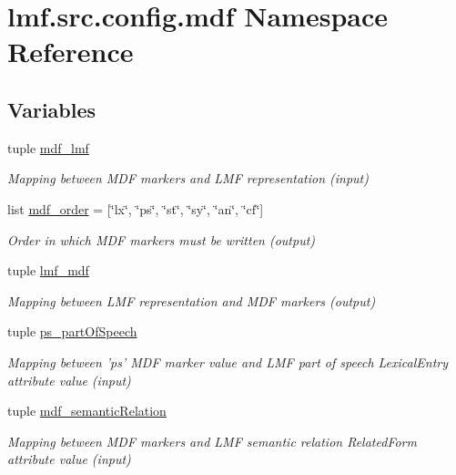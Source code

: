 \hypertarget{namespacelmf_1_1src_1_1config_1_1mdf}{\section{lmf.\+src.\+config.\+mdf Namespace Reference}
\label{namespacelmf_1_1src_1_1config_1_1mdf}
}
\subsection*{Variables}
\begin{DoxyCompactItemize}
\item 
tuple \hyperlink{namespacelmf_1_1src_1_1config_1_1mdf_a888cd9df8b9511d408e646dc404b5232}{mdf\+\_\+lmf}
\begin{DoxyCompactList}\small\item\em Mapping between M\+D\+F markers and L\+M\+F representation (input) \end{DoxyCompactList}\item 
list \hyperlink{namespacelmf_1_1src_1_1config_1_1mdf_afe5efb72442beb65b5083335b744845c}{mdf\+\_\+order} = \mbox{[}\char`\"{}lx\char`\"{}, \char`\"{}ps\char`\"{}, \char`\"{}st\char`\"{}, \char`\"{}sy\char`\"{}, \char`\"{}an\char`\"{}, \char`\"{}cf\char`\"{}\mbox{]}
\begin{DoxyCompactList}\small\item\em Order in which M\+D\+F markers must be written (output) \end{DoxyCompactList}\item 
tuple \hyperlink{namespacelmf_1_1src_1_1config_1_1mdf_a78d8f1444783c1b86cbbd91f49a0cd4f}{lmf\+\_\+mdf}
\begin{DoxyCompactList}\small\item\em Mapping between L\+M\+F representation and M\+D\+F markers (output) \end{DoxyCompactList}\item 
tuple \hyperlink{namespacelmf_1_1src_1_1config_1_1mdf_a1e76a452fc77f05851e4369134f5980b}{ps\+\_\+part\+Of\+Speech}
\begin{DoxyCompactList}\small\item\em Mapping between 'ps' M\+D\+F marker value and L\+M\+F part of speech Lexical\+Entry attribute value (input) \end{DoxyCompactList}\item 
tuple \hyperlink{namespacelmf_1_1src_1_1config_1_1mdf_a20455cbc7aa64cc6eb4ad1749a381738}{mdf\+\_\+semantic\+Relation}
\begin{DoxyCompactList}\small\item\em Mapping between M\+D\+F markers and L\+M\+F semantic relation Related\+Form attribute value (input) \end{DoxyCompactList}\item 

\end{DoxyCompactItemize}
